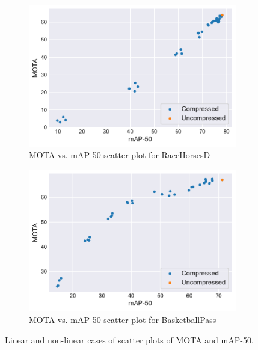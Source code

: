 \begin{figure}[!tb]
  \centering
  \begin{subfigure}[b]{.5\textwidth}
    \includegraphics[width=\textwidth]{img/MOTA_vs_mAP50_RaceHorsesD.pdf}
    \caption{MOTA vs. mAP-50 scatter plot for RaceHorsesD}
    \label{fig:MOTA_vs_mAP50_RaceHorsesD}
  \end{subfigure}%
  \begin{subfigure}[b]{.5\textwidth}
    \includegraphics[width=\textwidth]{img/MOTA_vs_mAP50_BasketballPass.pdf}
    \caption{MOTA vs. mAP-50 scatter plot for BasketballPass}
    \label{fig:MOTA_vs_mAP50_BasketballPass}
  \end{subfigure}
  \caption[Linear and non-linear cases of scatter plots of MOTA and mAP-50]{%
    Linear and non-linear cases of scatter plots of MOTA and mAP-50.%
  }
  \label{fig:MOTA_vs_mAP50_example}
\end{figure}